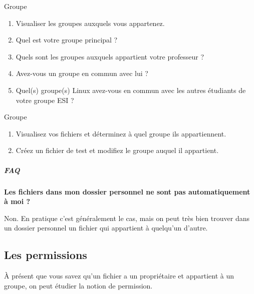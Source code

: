 \documentclass[a4paper,11pt]{article}
\begin{document}
\begin{Tutoriel}{Groupe}%
\begin{enumerate}	
	\item Visualiser les groupes auxquels vous appartenez.
	\item Quel est votre groupe principal ? 
	\item Quels sont les groupes auxquels appartient votre professeur ?
	\item Avez-vous un groupe en commun avec lui ?
	\item Quel(s) groupe(s) Linux avez-vous en commun avec les autres \'etudiants de votre groupe ESI ?
\end{enumerate}	
		\end{Tutoriel}
	

\begin{Tutoriel}{Groupe}	
%
\begin{enumerate}
	
	\item Visualisez vos fichiers et d\'eterminez \`a quel groupe ils appartiennent.
	\item Cr\'eez un fichier de test et modifiez le groupe auquel il appartient.
\end{enumerate}
		\end{Tutoriel}


		\subparagraph{FAQ} 

\textbf{Les fichiers dans mon dossier personnel ne sont pas automatiquement \`a moi ?}

Non. En pratique c'est g\'en\'eralement le cas, 
mais on peut tr\`es bien trouver dans un dossier personnel un fichier qui appartient \`a quelqu'un d'autre.  


        \subsection{Les permissions}  
\`A pr\'esent que vous savez qu'un fichier a un propri\'etaire et appartient \`a un groupe, 
on peut \'etudier la notion de permission.    
\end{document}

